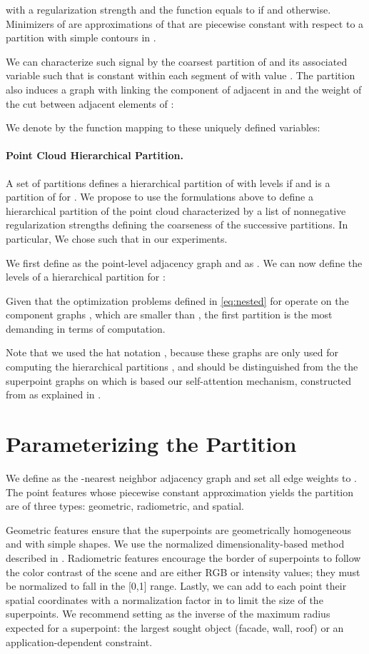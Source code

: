 with  a regularization strength and  the function equals to  if  and  otherwise. Minimizers of  are approximations of  that are piecewise constant with respect to a partition with simple contours in .

We can characterize such signal  by the coarsest partition  of  and its associated variable  such that  is constant within each segment  of  with value . 
The partition  also induces a graph  with  linking the component of  adjacent in  and  the weight of the cut between adjacent elements of : 


We denote by  the function mapping  to these uniquely defined variables:  



\paragraph{Point Cloud Hierarchical Partition.}
A set of partitions  defines a hierarchical partition of  with  levels if
 and  is a partition of  for . 
We propose to use the formulations above to define a hierarchical partition of the point cloud  characterized by a list  of nonnegative regularization strengths defining the coarseness of the successive partitions. In particular, We chose  such that  in our experiments.
 
We first define  as the point-level adjacency graph  and  as . We can now define the levels of a hierarchical partition  for :

Given that the optimization problems defined in \eqref{eq:nested} for  operate on the component graphs , which are smaller than , the first partition is the most demanding in terms of computation.

Note that we used the hat notation , because these graphs are only used for computing the hierarchical partitions , and should be distinguished from the the superpoint graphs  on which is based our self-attention mechanism, constructed from  as explained in .


\section{Parameterizing the Partition}
\label{sec:hyper}
We define  as the -nearest neighbor adjacency graph and set all edge weights  to . The point features  whose piecewise constant approximation yields the partition are of three types: geometric, radiometric, and spatial.

Geometric features ensure that the superpoints are geometrically homogeneous and with simple shapes. We use the normalized dimensionality-based method described in . Radiometric features encourage the border of superpoints to follow the color contrast of the scene and are either RGB or intensity values; they must be normalized to fall in the [0,1] range. Lastly, we can add to each point their spatial coordinates with a normalization factor  in  to limit the size of the superpoints. We recommend setting  as the inverse of the maximum radius expected for a superpoint: the largest sought object (facade, wall, roof) or an application-dependent constraint.

